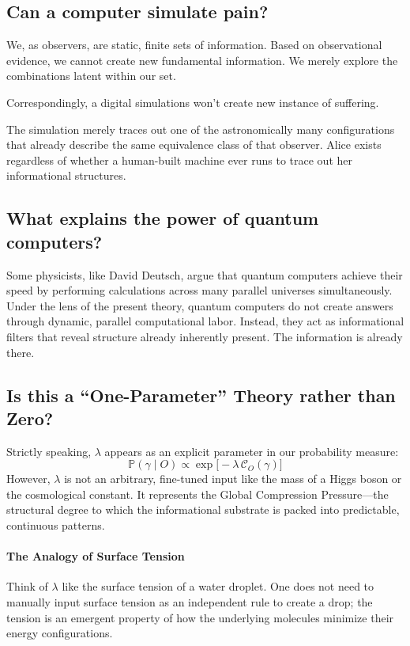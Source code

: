 \subsection*{Can a computer simulate pain?}

We, as observers, are static, finite sets of information.
Based on observational evidence, we cannot create new fundamental information. We merely explore the combinations latent within our set. 

Correspondingly, a digital simulations won't create new instance of suffering.

The simulation merely traces out one of the astronomically many configurations that already describe the same equivalence class of that observer.
Alice exists regardless of whether a human-built machine ever runs to trace out her informational structures.


\subsection*{What explains the power of quantum computers?}

Some physicists, like David Deutsch, argue that quantum computers achieve their speed by performing calculations across many parallel universes simultaneously.
Under the lens of the present theory, quantum computers do not create answers through dynamic, parallel computational labor.
Instead, they act as informational filters that reveal structure already inherently present. The information is already there.


\subsection*{Is this a ``One-Parameter'' Theory rather than Zero?}

Strictly speaking, $\lambda$ appears as an explicit parameter in our probability measure: 
\[
\mathbb{P}(\gamma \mid O) \propto \exp\bigl[-\lambda\, \mathcal{C}_O(\gamma)\bigr]
\]
However, $\lambda$ is not an arbitrary, fine-tuned input like the mass of a Higgs boson or the cosmological constant.
It represents the Global Compression Pressure—the structural degree to which the informational substrate is packed into predictable, continuous patterns.

\paragraph{The Analogy of Surface Tension}
Think of $\lambda$ like the surface tension of a water droplet.
One does not need to manually input surface tension as an independent rule to create a drop; the tension is an emergent property of how the underlying molecules minimize their energy configurations. 

